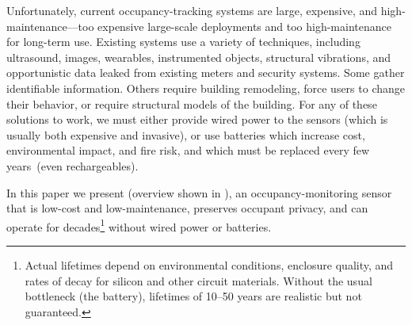 Unfortunately, current occupancy-tracking systems are large, expensive, and high-maintenance---too expensive large-scale deployments and too high-maintenance for long-term use.
%
Existing systems use a variety of techniques, including ultrasound\cite{hnat2012doorjamb}, images\cite{tyndall2016occupancy, teixeira2007lightweight}, wearables\cite{fishkin2005hands}, instrumented objects\cite{buettner2009activity}, structural vibrations\cite{pan2016occupant}, and opportunistic data leaked from existing meters and security systems\cite{yangoccupancy2014}.
Some gather identifiable information.
Others require building remodeling, force users to change their behavior, or require structural models of the building.
For any of these solutions to work, we must either provide wired power to the sensors (which is usually both expensive and invasive), or use batteries which increase cost, environmental impact, and fire risk, and which must be replaced every few years~(even rechargeables).

In this paper we present \sysname (overview shown in ), an occupancy-monitoring sensor that is low-cost and low-maintenance, preserves occupant privacy, and can operate for decades\footnote{Actual lifetimes depend on environmental conditions, enclosure quality, and rates of decay for silicon and other circuit materials. Without the usual bottleneck (the battery), lifetimes of 10--50 years are realistic but not guaranteed.} without wired power or batteries.
%


